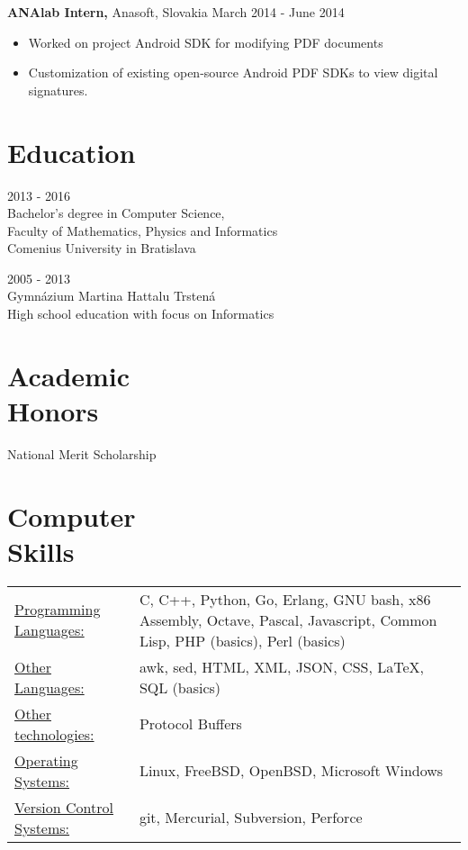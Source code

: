 \documentclass[margin]{res}
\begin{document}
\begin{resume}
{\bf ANAlab Intern,} Anasoft, Slovakia \hfill March 2014 - June 2014
\begin{itemize} \itemsep -2pt  %
\item Worked on project Android SDK for modifying PDF documents
\item Customization of existing open-source Android PDF SDKs to view digital signatures.
\end{itemize}


\section{Education}
2013 - 2016 \\
Bachelor's degree in Computer Science, \\ 
Faculty of Mathematics, Physics and Informatics \\
Comenius University in Bratislava

2005 - 2013 \\
Gymn\'{a}zium Martina Hattalu Trsten\'{a} \\
High school education with focus on Informatics

\section{Academic \\ Honors}
National Merit Scholarship

\section{Computer \\ Skills}
   \begin{tabular}{l p{3in}}
       \underline{Programming Languages:} & C, C++, Python, Go, Erlang, GNU bash, x86 Assembly, Octave, Pascal, Javascript, Common Lisp, PHP (basics), Perl (basics) \\
       \underline{Other Languages:} & awk, sed, HTML, XML, JSON, CSS, \LaTeX, SQL (basics) \\

       \underline{Other technologies:} & Protocol Buffers \\
       \underline{Operating Systems:} & Linux, FreeBSD, OpenBSD, Microsoft Windows \\
       \underline{Version Control Systems:} & git, Mercurial, Subversion, Perforce
 \end{tabular}


\end{resume}
\end{document}
